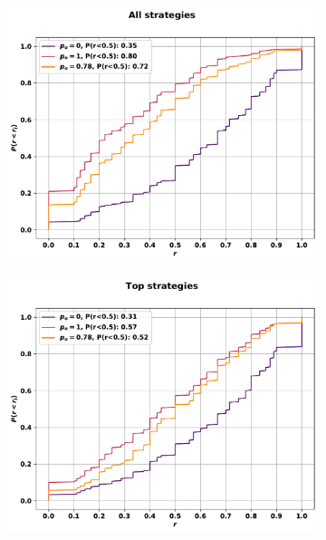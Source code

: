 \begin{figure}[!htbp]
    \begin{subfigure}{.45\textwidth}
    \includegraphics[width=\textwidth]{src/chapters/07/img/cfd_to_sequence_all_strategies.pdf}
    \end{subfigure}\hfill
    \begin{subfigure}{.45\textwidth}
    \includegraphics[width=\textwidth]{src/chapters/07/img/cfd_to_sequence_top_strategies.pdf}
    \end{subfigure}
    \begin{subfigure}{.45\textwidth}

\end{subfigure}
\end{figure}
